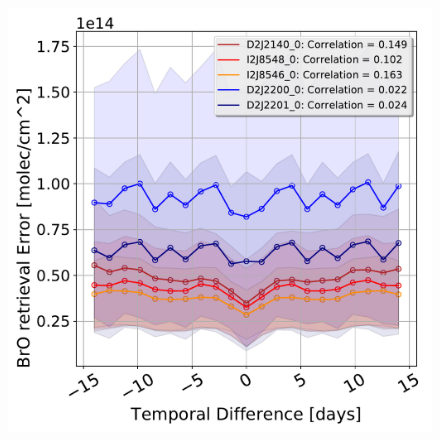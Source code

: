 \begin{figure}
	\centering
	\includegraphics[width=0.7\linewidth]{Bilder/DatallInstruments}
	\caption{}
	\label{fig:datallinstruments}
\end{figure}




